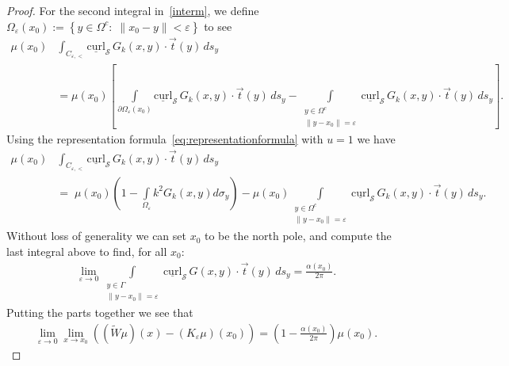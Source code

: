 \documentclass[final]{siamltex}
\renewcommand{\S} {\mathcal{S}}
\newcommand{\e}{\varepsilon}
\begin{document}
\begin{proof}
For the second integral in~\eqref{interm}, we define
$\Omega_{\varepsilon}(x_{0}):=\left\{ y\in\Omega^{c}:\; \|x_0-y\|<
\varepsilon \right\}$ to see
\begin{align*}
  \mu(x_0)&\int_{C_{\e,<}} \underline{\mbox{curl}}_{\S}\,
    G_k(x,y)\cdot\vec{t}(y)\,ds_{y} \\
  &= \mu(x_0) \left[ \int\limits_{\partial \Omega_{\varepsilon}(x_0)} 
  \underline{\mbox{curl}}_{\S}\,G_k(x,y)\cdot\vec{t}(y)\,ds_{y} - 
  \int\limits_{\substack{y \in \Omega^{c} \\ \|y - x_{0}\| =
  \varepsilon}}
\underline{\mbox{curl}}_{\S}\,G_k(x,y)\cdot\vec{t}(y)\,ds_{y} \right].
\end{align*}
Using the representation formula~\eqref{eq:representationformula} with
$u=1$ we have
\begin{align*}
  \mu(x_0)&\int_{C_{\e,<}} \underline{\mbox{curl}}_{\S}\,
    G_k(x,y)\cdot\vec{t}(y)\,ds_{y} \\
    &=\;\mu(x_0) \left(1 - \int\limits_{\Omega_{\varepsilon}} 
    k^2 G_k(x,y) d\sigma_{y}\right) 
   - \mu(x_0) \int\limits_{\substack{y \in \Omega^{c} \\ \|y - x_{0}\| =
  \varepsilon}}
\underline{\mbox{curl}}_{\S}\,G_k(x,y)\cdot\vec{t}(y)\,ds_{y}.
\end{align*}
Without loss of generality we can set $x_0$ to be the north pole, and
compute the last integral above  to find, for all $x_{0}$: 
\begin{align*}
  \lim_{\varepsilon\rightarrow 0}
  \int\limits_{\substack{y \in \Gamma \\ \|y - x_{0}\| = \varepsilon}}
  \underline{\mbox{curl}}_{\S}\,G(x,y)\cdot\vec{t}(y)\,ds_{y}
  =\frac{\alpha(x_0)}{2\pi}.
\end{align*}
Putting the parts together we see that
\begin{align*}
  \lim_{\varepsilon\rightarrow 0} \lim_{x\rightarrow x_0}
  \left((\widetilde{W}\mu)(x)-(K_{\varepsilon}\mu)(x_0)\right)
  =\left(1-\frac{\alpha(x_0)}{2\pi}\right)\mu(x_0).
\end{align*}
\end{proof}




\end{document}
